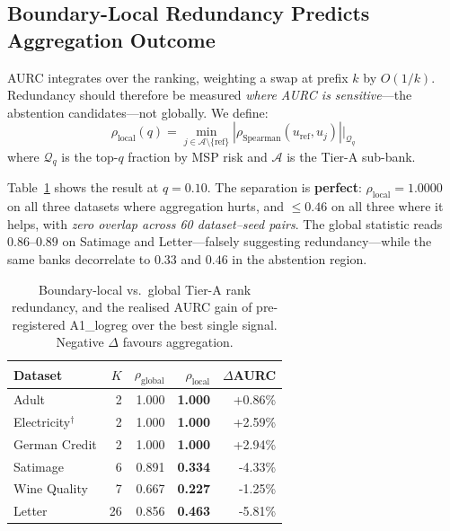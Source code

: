 \documentclass[conference]{IEEEtran}
\newcommand{\rholocal}{\rho_{\mathrm{local}}}
\newcommand{\rhoglobal}{\rho_{\mathrm{global}}}
\begin{document}
\subsection{Boundary-Local Redundancy Predicts Aggregation Outcome}
\label{sec:mechanism}

AURC integrates over the ranking, weighting a swap at prefix $k$ by $O(1/k)$. Redundancy should therefore be measured \emph{where AURC is sensitive}---the abstention candidates---not globally. We define:
\begin{equation}
  \rholocal(q) = \min_{j \in \mathcal{A} \setminus \{\mathrm{ref}\}} |\rho_{\mathrm{Spearman}}(u_{\mathrm{ref}}, u_j)| \Big|_{\mathcal{Q}_q}
  \label{eq:rholocal}
\end{equation}
where $\mathcal{Q}_q$ is the top-$q$ fraction by MSP risk and $\mathcal{A}$ is the Tier-A sub-bank.

Table~\ref{tab:rho_local} shows the result at $q{=}0.10$. The separation is \textbf{perfect}: $\rholocal = 1.0000$ on all three datasets where aggregation hurts, and $\le 0.46$ on all three where it helps, with \emph{zero overlap across 60 dataset--seed pairs}. The global statistic reads $0.86$--$0.89$ on Satimage and Letter---falsely suggesting redundancy---while the same banks decorrelate to $0.33$ and $0.46$ in the abstention region.

\begin{table}[t]
\centering
\caption{Boundary-local vs.\ global Tier-A rank redundancy, and the realised AURC gain of pre-registered A1\_logreg over the best single signal. Negative $\Delta$ favours aggregation.}
\label{tab:rho_local}
\begin{tabular}{l r r r r}
\toprule
Dataset & $K$ & $\rhoglobal$ & $\rholocal$ & $\Delta$AURC \\
\midrule
Adult & 2 & 1.000 & \textbf{1.000} & +0.86\% \\
Electricity$^{\dagger}$ & 2 & 1.000 & \textbf{1.000} & +2.59\% \\
German Credit & 2 & 1.000 & \textbf{1.000} & +2.94\% \\
\midrule
Satimage & 6 & 0.891 & \textbf{0.334} & -4.33\% \\
Wine Quality & 7 & 0.667 & \textbf{0.227} & -1.25\% \\
Letter & 26 & 0.856 & \textbf{0.463} & -5.81\% \\
\bottomrule
\end{tabular}
\end{table}
\end{document}
